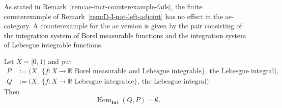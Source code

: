 As stated in Remark~\ref{rem:ae-mct-counterexample-fails}, the finite
counterexample of Remark~\ref{rem:D-I-not-left-adjoint} has no effect in the
ae-category.
A counterexample for the ae version is given by the pair consisting of the
integration system of Borel measurable functions and the integration system of
Lebesgue integrable functions.

\begin{proposition}\label{prop:no-morphism-lebesgue-to-borel}
  Let $X=[0,1)$ and put
  \begin{align*}
    P&:=\bigl(X,\ \{f:X\to\mathbb{R}\text{ Borel measurable and Lebesgue integrable}\},\ \text{the Lebesgue integral}\bigr),\\
    Q&:=\bigl(X,\ \{f:X\to\mathbb{R}\text{ Lebesgue integrable}\},\ \text{the Lebesgue integral}\bigr).
  \end{align*}
  Then
  \[
    \operatorname{Hom}_{\mathbf{Int}}(Q,P)=\emptyset.
  \]
\end{proposition}
